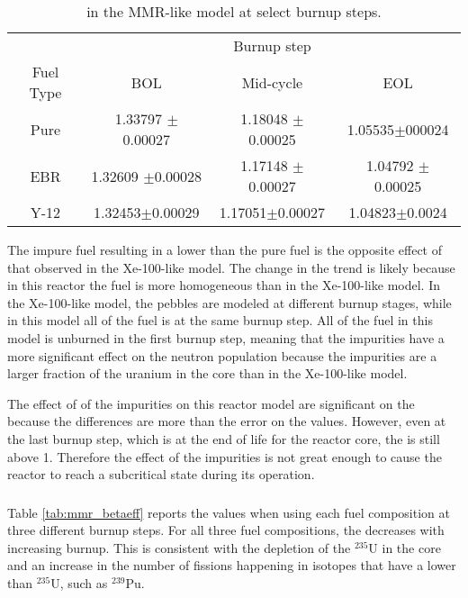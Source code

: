 \begin{table}
        \centering
        \caption{\keff in the \gls{MMR}-like model at select burnup 
        steps.}
        \label{tab:mmr_keff}
        \begin{tabular}{c c c c}
                \hline 
                & \multicolumn{3}{c}{Burnup step}\\
                Fuel Type & \gls{BOL} & Mid-cycle & \gls{EOL} \\
                \hline 
                Pure & 1.33797 $\pm$ 0.00027 & 1.18048 $\pm$ 0.00025 & 1.05535$\pm$000024\\
                \gls{EBR} & 1.32609 $\pm$0.00028 & 1.17148 $\pm$ 0.00027 & 1.04792 $\pm$ 0.00025 \\
                Y-12 & 1.32453$\pm$0.00029 & 1.17051$\pm$0.00027 & 1.04823$\pm$0.0024\\
                \hline
                
        \end{tabular}
\end{table}

The impure fuel resulting in a lower \keff than the pure fuel is the opposite 
effect of that observed in the Xe-100-like model. The change in the trend 
is likely because in this reactor the fuel is more homogeneous than in 
the Xe-100-like model. In the Xe-100-like model, the pebbles are modeled 
at different burnup stages, while in this model all of the fuel is at the 
same burnup step. All of the fuel in this model is unburned in the 
first burnup step, meaning that the impurities have a more significant 
effect on the neutron population because the impurities are a larger fraction 
of the uranium in the core than in the Xe-100-like model. 

The effect of of the impurities on this reactor model are significant on the 
\keff because the differences are more than the error on the values. However, 
even at the last burnup step, which is at the end of life for the reactor 
core, the \keff is still above 1. Therefore the effect of the impurities 
is not great enough to cause the reactor to reach a subcritical state 
during its operation. 



\subsubsection{\betaEff}

Table \ref{tab:mmr_betaeff} reports the \betaEff values when using 
each fuel composition at three different burnup steps. For all three 
fuel compositions, the \betaEff decreases with increasing burnup. This 
is consistent with the depletion of the $^{235}$U in the core and 
an increase in the number of fissions happening in isotopes
that have a lower \betaEff than $^{235}$U, such as $^{239}$Pu. 

